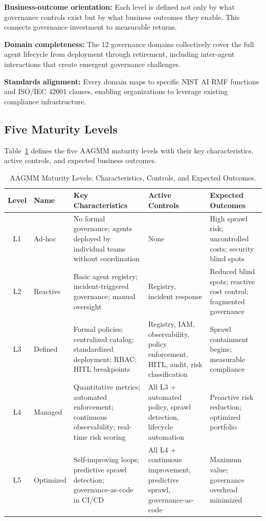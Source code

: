 \documentclass[ai,article,submit,pdftex,moreauthors]{Definitions/mdpi}
\begin{document}
\textbf{Business-outcome orientation:} Each level is defined not only by what governance controls exist but by what business outcomes they enable. This connects governance investment to measurable returns.

\textbf{Domain completeness:} The 12 governance domains collectively cover the full agent lifecycle from deployment through retirement, including inter-agent interactions that create emergent governance challenges.

\textbf{Standards alignment:} Every domain maps to specific NIST AI RMF functions and ISO/IEC 42001 clauses, enabling organizations to leverage existing compliance infrastructure.

\subsection{Five Maturity Levels}\label{sec:framework-levels}

Table~\ref{tab:maturity-levels} defines the five AAGMM maturity levels with their key characteristics, active controls, and expected business outcomes.

\begin{table}[htbp]
\caption{AAGMM Maturity Levels: Characteristics, Controls, and Expected Outcomes.}\label{tab:maturity-levels}
\centering
\small
\begin{tabularx}{\textwidth}{c l X X X}
\toprule
\textbf{Level} & \textbf{Name} & \textbf{Key Characteristics} & \textbf{Active Controls} & \textbf{Expected Outcomes} \\
\midrule
L1 & Ad-hoc & No formal governance; agents deployed by individual teams without coordination & None & High sprawl risk; uncontrolled costs; security blind spots \\
\addlinespace
L2 & Reactive & Basic agent registry; incident-triggered governance; manual oversight & Registry, incident response & Reduced blind spots; reactive cost control; fragmented governance \\
\addlinespace
L3 & Defined & Formal policies; centralized catalog; standardized deployment; RBAC; HITL breakpoints & Registry, IAM, observability, policy enforcement, HITL, audit, risk classification & Sprawl containment begins; measurable compliance \\
\addlinespace
L4 & Managed & Quantitative metrics; automated enforcement; continuous observability; real-time risk scoring & All L3 + automated policy, sprawl detection, lifecycle automation & Proactive risk reduction; optimized portfolio \\
\addlinespace
L5 & Optimized & Self-improving loops; predictive sprawl detection; governance-as-code in CI/CD & All L4 + continuous improvement, predictive sprawl, governance-as-code & Maximum value; governance overhead minimized \\
\bottomrule
\end{tabularx}
\end{table}
\end{document}
